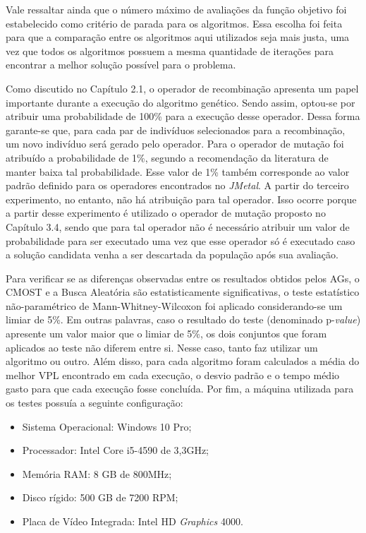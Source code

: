 Vale ressaltar ainda que o número máximo de avaliações da função objetivo foi estabelecido como critério de parada para os algoritmos. Essa escolha foi feita para que a comparação entre os algoritmos aqui utilizados seja mais justa, uma vez que todos os algoritmos possuem a mesma quantidade de iterações para encontrar a melhor solução possível para o problema. 

Como discutido no Capítulo 2.1, o operador de recombinação apresenta um papel importante durante a execução do algoritmo genético. Sendo assim, optou-se por atribuir uma probabilidade de 100\% para a execução desse operador. Dessa forma garante-se que, para cada par de indivíduos selecionados para a recombinação, um novo indivíduo será gerado pelo operador. Para o operador de mutação foi atribuído a probabilidade de 1\%, segundo a recomendação da literatura de manter baixa tal probabilidade. Esse valor de 1\% também corresponde ao valor padrão definido para os operadores encontrados no \textit{JMetal}. A partir do terceiro experimento, no entanto, não há atribuição para tal operador. Isso ocorre porque a partir desse experimento é utilizado o operador de mutação proposto no Capítulo 3.4, sendo que para tal operador não é necessário atribuir um valor de probabilidade para ser executado uma vez que esse operador só é executado caso a solução candidata venha a ser descartada da população após sua avaliação.

Para verificar se as diferenças observadas entre os resultados obtidos pelos AGs, o CMOST e a Busca Aleatória são estatisticamente significativas, o teste estatístico não-paramétrico de Mann-Whitney-Wilcoxon \cite{Corder2014} foi aplicado considerando-se um limiar de 5\%. Em outras palavras, caso o resultado do teste (denominado p-\textit{value}) apresente um valor maior que o limiar de 5\%, os dois conjuntos que foram aplicados ao teste não diferem entre si. Nesse caso, tanto faz utilizar um algoritmo ou outro. Além disso, para cada algoritmo foram calculados a média do melhor VPL encontrado em cada execução, o desvio padrão e o tempo médio gasto para que cada execução fosse concluída. Por fim, a máquina utilizada para os testes possuía a seguinte configuração:  

\begin{itemize}
\item Sistema Operacional: Windows 10 Pro;
\item Processador: Intel Core i5-4590 de 3,3GHz;
\item Memória RAM: 8 GB de 800MHz;
\item Disco rígido: 500 GB de 7200 RPM;
\item Placa de Vídeo Integrada: Intel HD \textit{Graphics} 4000.
\end{itemize}